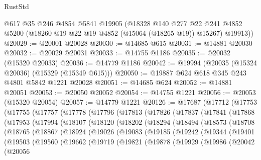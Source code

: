 \begin{lexlean}{RustStd}
\begin{coremodule}
      @617
      @35
      @246
      @4854
      @5841
      @19905
      (@18328
        @140
        @277
        @22
        @241
        @4852
        @5200
        (@18260 @19 @22 @19 @4852 (@15064 (@18265 @19)) @15267)
        @19913))
@20029 := @20001 @20028
@20030 := @14685 @615
@20031 := @14881 @20030
@20032 := @20029 @20031
@20033 := @14755 @1186
@20035 := @20032 (@15320 @20033)
@20036 := @14779 @1186
@20042 := @19994 (@20035 (@15324 @20036) (@15329 (@15349 @615)))
@20050 := @19887 @624 @618 @345 @243 @4801 @5842 @1221 @20028
@20051 := @14685 @624
@20052 := @14881 @20051
@20053 := @20050 @20052
@20054 := @14755 @1221
@20056 := @20053 (@15320 @20054)
@20057 := @14779 @1221
@20126 := @17687
    (@17712
      (@17753
        (@17755
          (@17757
            (@17778
              (@17796
                (@17813
                  (@17826
                    (@17837
                      (@17841
                        (@17868
                          (@17953
                            (@17994
                              (@18107
                                (@18120
                                  (@18202
                                    (@18294
                                      (@18494
                                        (@18573
                                          (@18708
                                            (@18765
                                              (@18867
                                                (@18924
                                                  (@19026
                                                    (@19083
                                                      (@19185
                                                        (@19242
                                                          (@19344
                                                            (@19401
                                                              (@19503
                                                                (@19560
                                                                  (@19662
                                                                    (@19719
                                                                      (@19821
                                                                        (@19878
                                                                          (@19929
                                                                            (@19986
                                                                              (@20042
                                                                                (@20056

\end{coremodule}
\end{lexlean}
